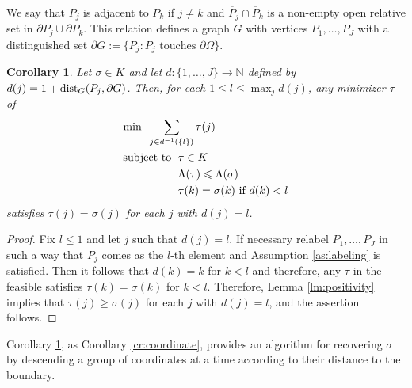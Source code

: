 \documentclass{article}
\newtheorem{corollary}[theorem]{Corollary}
\theoremstyle{definition}
\theoremstyle{remark}
\renewcommand{\leq}{\leqslant}
\renewcommand{\geq}{\geqslant}
\begin{document}
We say that $P_j$ is adjacent to $P_k$ if $j\neq k$ and $\overline P_j \cap \overline P_k$ is a non-empty open relative set in $\partial P_j\cup \partial P_k$.
This relation defines a graph $G$ with vertices $P_1,\dots,P_J$ with a distinguished set $\partial G := \{ P_j : P_j \text{ touches }\partial\Omega\}$.
\begin{corollary}\label{cr:multipledescent}
Let $\sigma\in K$ and let $d:\{1,\dots,J\}\to\mathbb N$ defined by $d(j)=1+\textup{dist}_G(P_j,\partial G)$.
Then, for each $1\leq l \leq \max_j d(j)$, any minimizer $\tau$ of
\begin{align*}
&\textup{min}\;\; \sum_{j\in d^{-1}\left(\{l\}\right)}\tau(j) \\
&\textup{subject to }\; \tau \in K \\
&\phantom{\textup{subject to }\;} \Lambda(\tau) \leq \Lambda(\sigma) \\
&\phantom{\textup{subject to }\;} \tau(k) = \sigma(k) \textup{ if } d(k) < l
\end{align*}
satisfies $\tau(j)=\sigma(j)$ for each $j$ with $d(j)=l$.
\end{corollary}
\begin{proof}
Fix $\displaystyle l\leq 1$ and let $j$ such that $d(j)=l$.
If necessary relabel $P_1,\dots,P_J$ in such a way that $P_j$ comes as the $l$-th element and Assumption \ref{as:labeling} is satisfied.
Then it follows that $d(k)=k$ for $k<l$ and therefore, any $\tau$ in the feasible satisfies $\tau(k)=\sigma(k)$ for $k<l$.
Therefore, Lemma \ref{lm:positivity} implies that $\tau(j)\geq\sigma(j)$ for each $j$ with $d(j)=l$, and the assertion follows.
\end{proof}
Corollary \ref{cr:multipledescent}, as Corollary \ref{cr:coordinate}, provides an algorithm for recovering $\sigma$ by descending a group of coordinates at a time according to their distance to the boundary.
\end{document}
